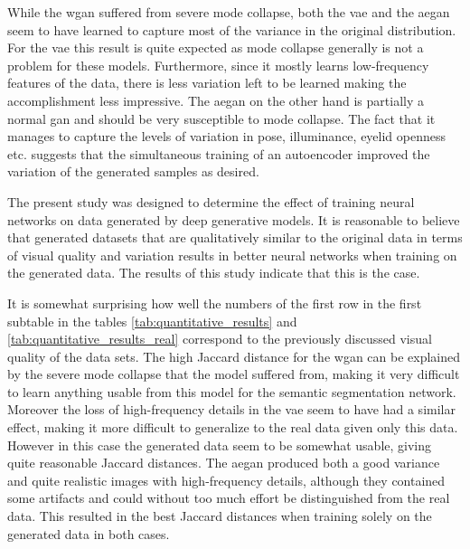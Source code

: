 While the \acrshort{wgan} suffered from severe mode collapse, both the \acrshort{vae} and the \acrshort{aegan} seem to have learned to capture most of the variance in the original distribution. For the \acrshort{vae} this result is quite expected as mode collapse generally is not a problem for these models. Furthermore, since it mostly learns low-frequency features of the data, there is less variation left to be learned making the accomplishment less impressive. The \acrshort{aegan} on the other hand is partially a normal \acrshort{gan} and should be very susceptible to mode collapse. The fact that it manages to capture the levels of variation in pose, illuminance, eyelid openness etc. suggests that the simultaneous training of an autoencoder improved the variation of the generated samples as desired.





The present study was designed to determine the effect of training neural networks on data generated by deep generative models. It is reasonable to believe that generated datasets that are qualitatively similar to the original data in terms of visual quality and variation results in better neural networks when training on the generated data. The results of this study indicate that this is the case. 

It is somewhat surprising how well the numbers of the first row in the first subtable in the tables \ref{tab:quantitative_results} and \ref{tab:quantitative_results_real} correspond to the previously discussed visual quality of the data sets. 
The high Jaccard distance for the \acrshort{wgan} can be explained by the severe mode collapse that the model suffered from, making it very difficult to learn anything usable from this model for the semantic segmentation network. Moreover the loss of high-frequency details in the \acrshort{vae} seem to have had a similar effect, making it more difficult to generalize to the real data given only this data. However in this case the generated data seem to be somewhat usable, giving quite reasonable Jaccard distances. The \acrshort{aegan} produced both a good variance and quite realistic images with high-frequency details, although they contained some artifacts and could without too much effort be distinguished from the real data. This resulted in the best Jaccard distances when training solely on the generated data in both cases.

